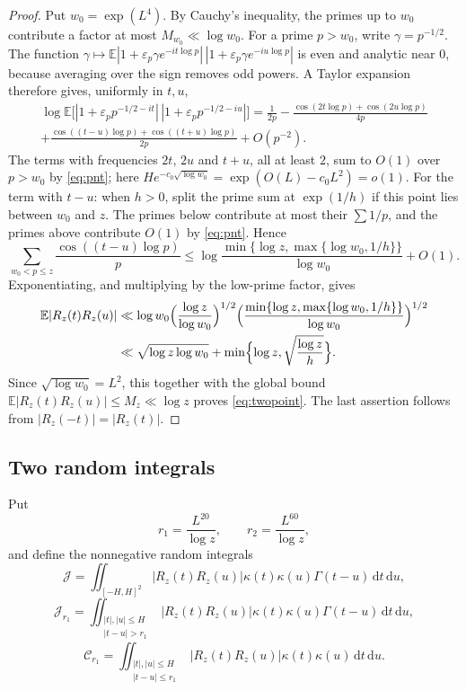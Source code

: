 \documentclass[11pt]{amsart}
\theoremstyle{remark}
\numberwithin{equation}{section}
\newcommand{\E}{\mathbb{E}}
\newcommand{\dd}{\,\mathrm{d}}
\begin{document}
\begin{proof}
Put $w_0=\exp(L^4)$. By Cauchy's inequality, the primes up to $w_0$ contribute a factor at most $M_{w_0}\ll\log w_0$. For a prime $p>w_0$, write $\gamma=p^{-1/2}$. The function $\gamma\mapsto\E|1+\varepsilon_p\gamma e^{-it\log p}|\,|1+\varepsilon_p\gamma e^{-iu\log p}|$ is even and analytic near $0$, because averaging over the sign removes odd powers. A Taylor expansion therefore gives, uniformly in $t,u$,
\begin{multline*}
\log\E\bigl[|1+\varepsilon_pp^{-1/2-it}|\,|1+\varepsilon_pp^{-1/2-iu}|\bigr]=\frac1{2p}-\frac{\cos(2t\log p)+\cos(2u\log p)}{4p}\\
+\frac{\cos((t-u)\log p)+\cos((t+u)\log p)}{2p}+O(p^{-2}).
\end{multline*}
The terms with frequencies $2t$, $2u$ and $t+u$, all at least $2$, sum to $O(1)$ over $p>w_0$ by \eqref{eq:pnt}; here $He^{-c_0\sqrt{\log w_0}}=\exp(O(L)-c_0L^2)=o(1)$. For the term with $t-u$: when $h>0$, split the prime sum at $\exp(1/h)$ if this point lies between $w_0$ and $z$. The primes below contribute at most their $\sum1/p$, and the primes above contribute $O(1)$ by \eqref{eq:pnt}. Hence
\[
\sum_{w_0<p\le z}\frac{\cos((t-u)\log p)}{p}\le\log\frac{\min\{\log z,\max\{\log w_0,1/h\}\}}{\log w_0}+O(1).
\]
Exponentiating, and multiplying by the low-prime factor, gives
\begin{align*}
\E|R_z(t)R_z(u)|&\ll\log w_0\Bigl(\frac{\log z}{\log w_0}\Bigr)^{1/2}\Bigl(\frac{\min\{\log z,\max\{\log w_0,1/h\}\}}{\log w_0}\Bigr)^{1/2}\\
&\ll\sqrt{\log z\log w_0}+\min\Bigl\{\log z,\sqrt{\frac{\log z}{h}}\Bigr\}.
\end{align*}
Since $\sqrt{\log w_0}=L^2$, this together with the global bound $\E|R_z(t)R_z(u)|\le M_z\ll\log z$ proves \eqref{eq:twopoint}. The last assertion follows from $|R_z(-t)|=|R_z(t)|$.
\end{proof}

\subsection{Two random integrals}
Put
\[
r_1=\frac{L^{20}}{\log z},\qquad r_2=\frac{L^{60}}{\log z},
\]
and define the nonnegative random integrals
\[
\mathcal J=\iint_{[-H,H]^2}|R_z(t)R_z(u)|\kappa(t)\kappa(u)\Gamma(t-u)\dd t\dd u,
\]
\[
\mathcal J_{r_1}=\iint_{\substack{|t|,|u|\le H\\|t-u|>r_1}}|R_z(t)R_z(u)|\kappa(t)\kappa(u)\Gamma(t-u)\dd t\dd u,
\]
\[
\mathcal C_{r_1}=\iint_{\substack{|t|,|u|\le H\\|t-u|\le r_1}}|R_z(t)R_z(u)|\kappa(t)\kappa(u)\dd t\dd u .
\]
\end{document}
